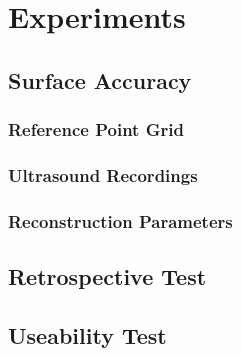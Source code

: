 \chapter{Experiments}
\section{Surface Accuracy}
\subsection{Reference Point Grid}
\subsection{Ultrasound Recordings}
\subsection{Reconstruction Parameters}
\section{Retrospective Test}
\section{Useability Test}